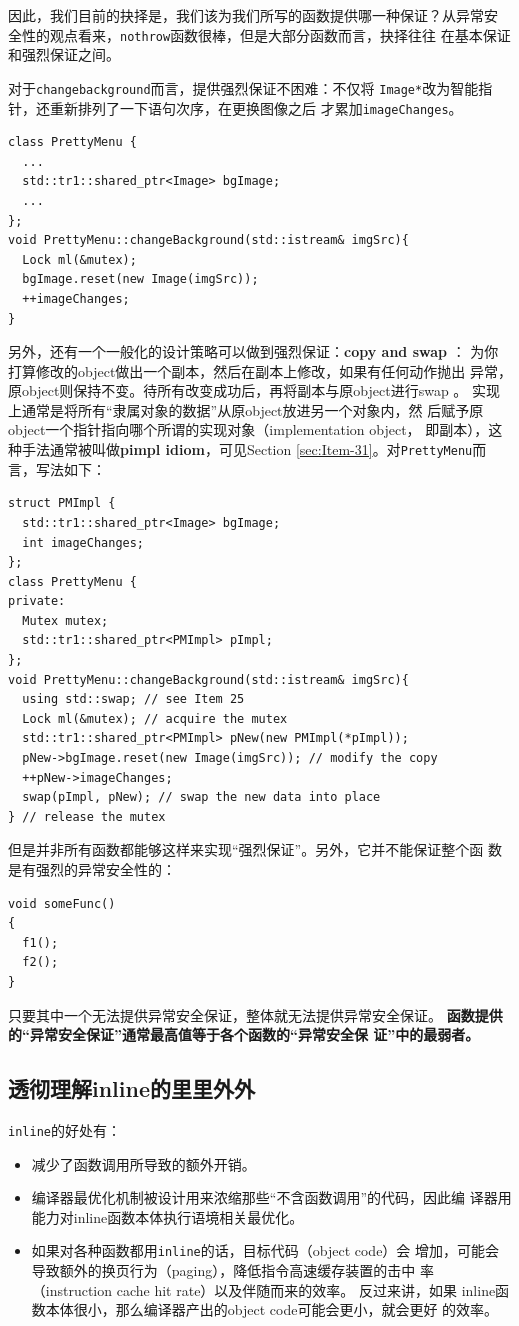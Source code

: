 因此，我们目前的抉择是，我们该为我们所写的函数提供哪一种保证？从异常安
全性的观点看来，\texttt{nothrow}函数很棒，但是大部分函数而言，抉择往往
在基本保证和强烈保证之间。

对于\texttt{changebackground}而言，提供强烈保证不困难：不仅将
\texttt{Image*}改为智能指针，还重新排列了一下语句次序，在更换图像之后
才累加\texttt{imageChanges}。
\begin{verbatim}
class PrettyMenu {
  ...
  std::tr1::shared_ptr<Image> bgImage;
  ...
};
void PrettyMenu::changeBackground(std::istream& imgSrc){
  Lock ml(&mutex);
  bgImage.reset(new Image(imgSrc));
  ++imageChanges;
}
\end{verbatim}

另外，还有一个一般化的设计策略可以做到强烈保证：\textbf{copy and swap}
： 
为你打算修改的object做出一个副本，然后在副本上修改，如果有任何动作抛出
异常，原object则保持不变。待所有改变成功后，再将副本与原object进行swap
。 实现上通常是将所有“隶属对象的数据”从原object放进另一个对象内，然
后赋予原object一个指针指向哪个所谓的实现对象（implementation object，
即副本），这种手法通常被叫做\textbf{pimpl idiom}，可见Section
\ref{sec:Item-31}。对\texttt{PrettyMenu}而言，写法如下：
\begin{verbatim}
struct PMImpl { 
  std::tr1::shared_ptr<Image> bgImage;
  int imageChanges; 
};
class PrettyMenu {
private:
  Mutex mutex;
  std::tr1::shared_ptr<PMImpl> pImpl;
};
void PrettyMenu::changeBackground(std::istream& imgSrc){
  using std::swap; // see Item 25
  Lock ml(&mutex); // acquire the mutex
  std::tr1::shared_ptr<PMImpl> pNew(new PMImpl(*pImpl));
  pNew->bgImage.reset(new Image(imgSrc)); // modify the copy
  ++pNew->imageChanges;
  swap(pImpl, pNew); // swap the new data into place
} // release the mutex
\end{verbatim}

但是并非所有函数都能够这样来实现“强烈保证”。另外，它并不能保证整个函
数是有强烈的异常安全性的：
\begin{verbatim}
void someFunc()
{
  f1();
  f2();
}
\end{verbatim}
只要其中一个无法提供异常安全保证，整体就无法提供异常安全保证。
\textbf{函数提供的“异常安全保证”通常最高值等于各个函数的“异常安全保
  证”中的最弱者。}

\subsection{透彻理解inline的里里外外}
\label{sec:Item-30}

\texttt{inline}的好处有：
\begin{itemize}
\item 减少了函数调用所导致的额外开销。
\item 编译器最优化机制被设计用来浓缩那些“不含函数调用”的代码，因此编
  译器用能力对inline函数本体执行语境相关最优化。
\item 如果对各种函数都用\texttt{inline}的话，目标代码（object code）会
  增加，可能会导致额外的换页行为（paging），降低指令高速缓存装置的击中
  率（instruction cache hit rate）以及伴随而来的效率。 反过来讲，如果
  inline函数本体很小，那么编译器产出的object code可能会更小，就会更好
  的效率。
\end{itemize}


